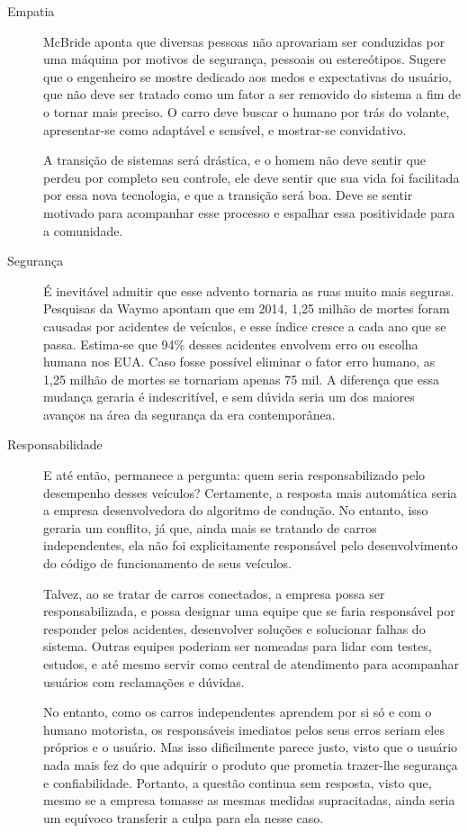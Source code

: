 \documentclass[12pt]{article}
\begin{document}
\begin{description}
			\item [Empatia] McBride aponta que diversas pessoas não aprovariam ser conduzidas por uma máquina por motivos de segurança, pessoais ou estereótipos. Sugere que o engenheiro se mostre dedicado aos medos e expectativas do usuário, que não deve ser tratado como um fator a ser removido do sistema a fim de o tornar mais preciso. O carro deve buscar o humano por trás do volante, apresentar-se como adaptável e sensível, e mostrar-se convidativo.
			
			A transição de sistemas será drástica, e o homem não deve sentir que perdeu por completo seu controle, ele deve sentir que sua vida foi facilitada por essa nova tecnologia, e que a transição será boa. Deve se sentir motivado para acompanhar esse processo e espalhar essa positividade para a comunidade.
			
			\item [Segurança] É inevitável admitir que esse advento tornaria as ruas muito mais seguras. Pesquisas da Waymo \citep{google_-_alphabet_inc._waymo_2009} apontam que em 2014, 1,25 milhão de mortes foram causadas por acidentes de veículos, e esse índice cresce a cada ano que se passa. Estima-se que 94\% desses acidentes envolvem erro ou escolha humana nos EUA. Caso fosse possível eliminar o fator erro humano, as 1,25 milhão de mortes se tornariam apenas 75 mil. A diferença que essa mudança geraria é indescritível, e sem dúvida seria um dos maiores avanços na área da segurança da era contemporânea.
			
			\item [Responsabilidade] E até então, permanece a pergunta: quem seria responsabilizado pelo desempenho desses veículos? Certamente, a resposta mais automática seria a empresa desenvolvedora do algoritmo de condução. No entanto, isso geraria um conflito, já que, ainda mais se tratando de carros independentes, ela não foi explicitamente responsável pelo desenvolvimento do código de funcionamento de seus veículos.
			
			Talvez, ao se tratar de carros conectados, a empresa possa ser responsabilizada, e possa designar uma equipe que se faria responsável por responder pelos acidentes, desenvolver soluções e solucionar falhas do sistema. Outras equipes poderiam ser nomeadas para lidar com testes, estudos, e até mesmo servir como central de atendimento para acompanhar usuários com reclamações e dúvidas.
			
			No entanto, como os carros independentes aprendem por si só e com o humano motorista, os responsáveis imediatos pelos seus erros seriam eles próprios e o usuário. Mas isso dificilmente parece justo, visto que o usuário nada mais fez do que adquirir o produto que prometia trazer-lhe segurança e confiabilidade. Portanto, a questão continua sem resposta, visto que, mesmo se a empresa tomasse as mesmas medidas supracitadas, ainda seria um equívoco transferir a culpa para ela nesse caso.
			

\end{description}
\end{document}

